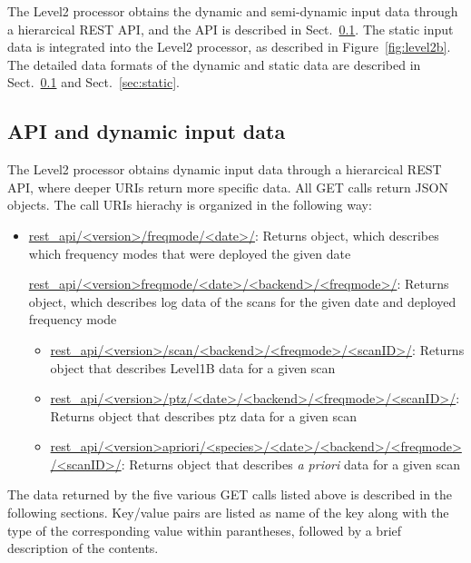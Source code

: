 The Level2 processor obtains the dynamic 
and semi-dynamic input data through a hierarcical
REST API, and the API is described in Sect.~\ref{sec:api}.
The static input data is integrated into the
Level2 processor, as described in Figure~\ref{fig:level2b}. 
The detailed data formats of the dynamic 
and static data are described in 
Sect.~\ref{sec:api} and Sect.~\ref{sec:static}.


\clearpage
\newpage
\subsection{API and dynamic input data}
\label{sec:api}

The Level2 processor obtains dynamic input data through
a hierarcical REST API, where deeper URIs return more
specific data. All GET calls return JSON objects.
The call URIs hierachy is organized in the following way:
\begin{itemize}
    \item \url{rest_api/<version>/freqmode/<date>/}: Returns object, which describes which frequency modes that were deployed the
    given date
    \begin{itemize}
        \url{rest_api/<version>freqmode/<date>/<backend>/<freqmode>/}: Returns object, which describes log data of the scans
        for the given date and deployed frequency mode
        \begin{itemize}
           \item \url{rest_api/<version>/scan/<backend>/<freqmode>/<scanID>/}: Returns object that describes Level1B data for a given scan       
           \item \url{rest_api/<version>/ptz/<date>/<backend>/<freqmode>/<scanID>/}: Returns object that describes ptz data for a given scan
           \item \url{rest_api/<version>apriori/<species>/<date>/<backend>/<freqmode>/<scanID>/}: Returns object that describes \textit{a priori} data for a given scan
        \end{itemize}  
    \end{itemize}
\end{itemize}
  
The data returned by the five various GET calls listed above 
is described in the following sections.
Key/value pairs are listed as name of the key
along with the type of the corresponding value within parantheses, followed
by a brief description of the contents.


